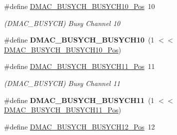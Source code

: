 \begin{DoxyCompactItemize}
\item 
\hypertarget{group___s_a_m_l21___d_m_a_c_gadf1410389758eedbf9aa209f271500ea}{}\#define \hyperlink{group___s_a_m_l21___d_m_a_c_gadf1410389758eedbf9aa209f271500ea}{D\+M\+A\+C\+\_\+\+B\+U\+S\+Y\+C\+H\+\_\+\+B\+U\+S\+Y\+C\+H10\+\_\+\+Pos}~10\label{group___s_a_m_l21___d_m_a_c_gadf1410389758eedbf9aa209f271500ea}

\begin{DoxyCompactList}\small\item\em (D\+M\+A\+C\+\_\+\+B\+U\+S\+Y\+C\+H) Busy Channel 10 \end{DoxyCompactList}\item 
\hypertarget{group___s_a_m_l21___d_m_a_c_ga78532961d9e529e936e0bdc8793cd16c}{}\#define {\bfseries D\+M\+A\+C\+\_\+\+B\+U\+S\+Y\+C\+H\+\_\+\+B\+U\+S\+Y\+C\+H10}~(1 $<$$<$ \hyperlink{group___s_a_m_l21___d_m_a_c_gadf1410389758eedbf9aa209f271500ea}{D\+M\+A\+C\+\_\+\+B\+U\+S\+Y\+C\+H\+\_\+\+B\+U\+S\+Y\+C\+H10\+\_\+\+Pos})\label{group___s_a_m_l21___d_m_a_c_ga78532961d9e529e936e0bdc8793cd16c}

\item 
\hypertarget{group___s_a_m_l21___d_m_a_c_ga7186588bc0dfff4f08a967174415c472}{}\#define \hyperlink{group___s_a_m_l21___d_m_a_c_ga7186588bc0dfff4f08a967174415c472}{D\+M\+A\+C\+\_\+\+B\+U\+S\+Y\+C\+H\+\_\+\+B\+U\+S\+Y\+C\+H11\+\_\+\+Pos}~11\label{group___s_a_m_l21___d_m_a_c_ga7186588bc0dfff4f08a967174415c472}

\begin{DoxyCompactList}\small\item\em (D\+M\+A\+C\+\_\+\+B\+U\+S\+Y\+C\+H) Busy Channel 11 \end{DoxyCompactList}\item 
\hypertarget{group___s_a_m_l21___d_m_a_c_gabbee4fc41aa5fa19d92992f0cdf3fa3e}{}\#define {\bfseries D\+M\+A\+C\+\_\+\+B\+U\+S\+Y\+C\+H\+\_\+\+B\+U\+S\+Y\+C\+H11}~(1 $<$$<$ \hyperlink{group___s_a_m_l21___d_m_a_c_ga7186588bc0dfff4f08a967174415c472}{D\+M\+A\+C\+\_\+\+B\+U\+S\+Y\+C\+H\+\_\+\+B\+U\+S\+Y\+C\+H11\+\_\+\+Pos})\label{group___s_a_m_l21___d_m_a_c_gabbee4fc41aa5fa19d92992f0cdf3fa3e}

\item 
\hypertarget{group___s_a_m_l21___d_m_a_c_ga10e544cbddcba33a11edf591088f949e}{}\#define \hyperlink{group___s_a_m_l21___d_m_a_c_ga10e544cbddcba33a11edf591088f949e}{D\+M\+A\+C\+\_\+\+B\+U\+S\+Y\+C\+H\+\_\+\+B\+U\+S\+Y\+C\+H12\+\_\+\+Pos}~12\label{group___s_a_m_l21___d_m_a_c_ga10e544cbddcba33a11edf591088f949e}


\end{DoxyCompactItemize}
